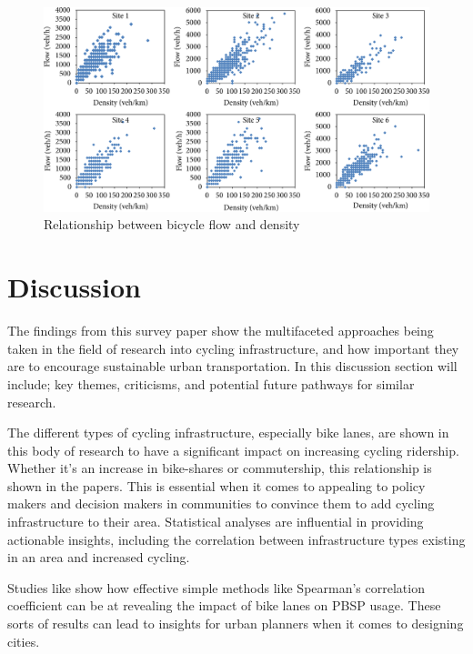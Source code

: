 \documentclass[12pt, letterpaper]{article}
\begin{document}
\begin{figure}[hbt!]
    \centering \includegraphics[width=1\textwidth]{flowdensity.png}
    \caption{Relationship between bicycle flow and density}
    \label{fig:flow}
\end{figure}


\section{Discussion}
\label{sec:disc}

The findings from this survey paper show the multifaceted approaches being taken in the field of research into cycling infrastructure, and how important they are to encourage sustainable urban transportation. In this discussion section will include; key themes, criticisms, and potential future pathways for similar research. \par

The different types of cycling infrastructure, especially bike lanes, are shown in this body of research to have a significant impact on increasing cycling ridership. Whether it's an increase in bike-shares or commutership, this relationship is shown in the papers. This is essential when it comes to appealing to policy makers and decision makers in communities to convince them to add cycling infrastructure to their area. Statistical analyses are influential in providing actionable insights, including the correlation between infrastructure types existing in an area and increased cycling. \par

Studies like \citet{1MateoBabiano2016} show how effective simple methods like Spearman's correlation coefficient can be at revealing the impact of bike lanes on PBSP usage. These sorts of results can lead to insights for urban planners when it comes to designing cities. \par
\end{document}

